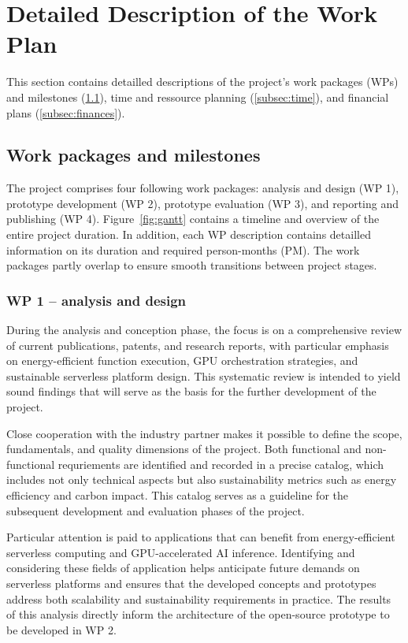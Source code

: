 \clearpage
\section{Detailed Description of the Work Plan}

This section contains detailled descriptions of the project's work packages (WPs) and milestones (\cref{subsec:wp}), time and ressource planning (\cref{subsec:time}), and financial plans (\cref{subsec:finances}).

\subsection{Work packages and milestones}\label{subsec:wp}

The project comprises four following work packages: analysis and design (WP 1), prototype development (WP 2), prototype evaluation (WP 3), and reporting and publishing (WP 4).
Figure~\ref{fig:gantt} contains a timeline and overview of the entire project duration.
In addition, each WP description contains detailled information on its duration and required person-months (PM).
The work packages partly overlap to ensure smooth transitions between project stages.

\subsubsection{WP 1 -- analysis and design}

During the analysis and conception phase, the focus is on a comprehensive review of current publications, patents, and research reports, with particular emphasis on energy-efficient function execution, GPU orchestration strategies, and sustainable serverless platform design.
This systematic review is intended to yield sound findings that will serve as the basis for the further development of the project.

Close cooperation with the industry partner makes it possible to define the scope, fundamentals, and quality dimensions of the project.
Both functional and non-functional requriements are identified and recorded in a precise catalog, which includes not only technical aspects but also sustainability metrics such as energy efficiency and carbon impact.
This catalog serves as a guideline for the subsequent development and evaluation phases of the project.

Particular attention is paid to applications that can benefit from energy-efficient serverless computing and GPU-accelerated AI inference.
Identifying and considering these fields of application helps anticipate future demands on serverless platforms and ensures that the developed concepts and prototypes address both scalability and sustainability requirements in practice.
The results of this analysis directly inform the architecture of the open-source prototype to be developed in WP 2.


